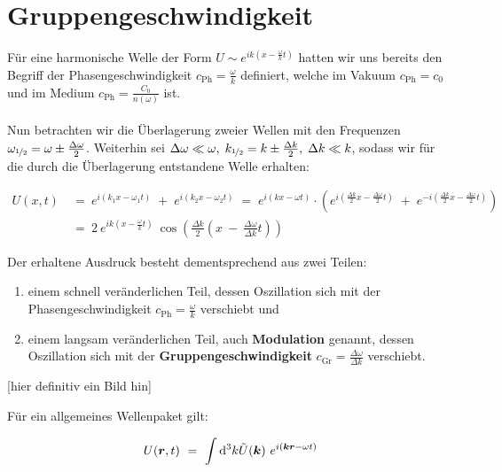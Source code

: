 \section{Gruppengeschwindigkeit}

Für eine harmonische Welle der Form $U \sim e^{ik(x-\frac{\omega}{k}t)}$ hatten wir uns bereits den Begriff der Phasengeschwindigkeit $c_{\text{Ph}} = \frac{\omega}{k}$ definiert, welche im Vakuum $c_{\text{Ph}}=c_0$ und im Medium $c_{\text{Ph}}= \frac{C_0}{n(\omega)}$ ist.\\
\ \\
Nun betrachten wir die Überlagerung zweier Wellen mit den Frequenzen $\omega_{\nicefrac{1}{2}} = \omega \pm \frac{\Delta\omega}{2}$. Weiterhin sei $\Delta\omega\ll\omega, \; k_{\nicefrac{1}{2}} = k \pm \frac{\Delta k}{2}, \; \Delta k \ll k$, sodass wir für die durch die Überlagerung entstandene Welle erhalten:

\begin{align*}
U(x,t) \ &= \ e^{i(k_1 x -\omega_1 t)} \; + \; e^{i(k_2 x - \omega_2 t)} \; = \; e^{i(kx-\omega t)} \cdot \left(e^{i\left(\frac{\Delta k}{2}x - \frac{\Delta \omega}{2}t \right)} \; + \; e^{-i\left(\frac{\Delta k}{2}x - \frac{\Delta \omega}{2}t\right)}\right)\\
&= \ 2 \ e^{ik(x-\frac{\omega}{k} t)} \ \cos\left(\frac{\Delta k}{2}\left(x \ - \ \frac{\Delta \omega}{\Delta k}t\right)\right)
\end{align*}

Der erhaltene Ausdruck besteht dementsprechend aus zwei Teilen:\\
\begin{enumerate}[label=\roman*)]
\item einem schnell veränderlichen Teil, dessen Oszillation sich mit der Phasengeschwindigkeit $c_{\text{Ph}} =\frac{\omega}{k}$ verschiebt und

\item einem langsam veränderlichen Teil, auch \textbf{Modulation} genannt, dessen Oszillation sich mit der \textbf{Gruppengeschwindigkeit} $c_{\text{Gr}} = \frac{\Delta \omega}{\Delta k}$ verschiebt.
\end{enumerate}

[hier definitiv ein Bild hin]

Für ein allgemeines Wellenpaket gilt:

\begin{equation*}
U(\bm{r},t)  \ = \ \int\mathrm{d}^3 k  \tilde{U}(\bm{k}) \ e^{i(\bm{k}\bm{r}-\omega t)}
\end{equation*}

